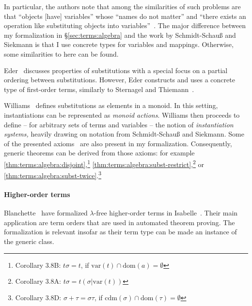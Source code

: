 In particular, the authors note that among the similarities of such problems are that ``objects [have] variables'' whose ``names do not matter'' and ``there exists an operation like substituting objects into variables''~\cite[§1]{schmidt1988unification}.
The major difference between my formalization in §\ref{sec:terms:algebra} and the work by Schmidt-Schauß and Siekmann is that I use concrete types for variables and mappings.
Otherwise, some similarities to here can be found.

Eder~\cite{eder1985properties} discusses properties of substitutions with a special focus on a partial ordering between substitutions.
However, Eder constructs and uses a concrete type of first-order terms, similarly to Sternagel and Thiemann~\cite{sternagel2018terms}.

Williams~\cite{williams1991instantiation} defines substitutions as elements in a monoid.
In this setting, instantiations can be represented as \emph{monoid actions}.
Williams then proceeds to define -- for arbitrary sets of terms and variables -- the notion of \emph{instantiation systems,} heavily drawing on notation from Schmidt-Schauß and Siekmann.
Some of the presented axioms~\cite[§2]{williams1991instantiation} are also present in my formalization.
Consequently, generic theorems can be derived from those axioms:
for example \cref{thm:terms:algebra:disjoint},\footnote{Corollary 3.8B: $t\sigma = t$, if $\mathrm{var}(t) \cap \mathrm{dom}(a) = \emptyset$}
\cref{thm:terms:algebra:subst-restrict},\footnote{Corollary 3.8A: $t\sigma = t(\sigma|\mathrm{var}(t))$} or
\cref{thm:terms:algebra:subst-twice}.\footnote{Corollary 3.8D: $\sigma + \tau = \sigma \tau$, if $\mathrm{cdm}(\sigma) \cap \mathrm{dom}(\tau) = \emptyset$}

\paragraph{Higher-order terms}
Blanchette \etal\ have formalized $\lambda$-free higher-order terms in Isabelle~\cite{becker2016lambda,blanchette2016lambda}.
Their main application are term orders that are used in automated theorem proving.
The formalization is relevant insofar as their term type can be made an instance of the generic  class.